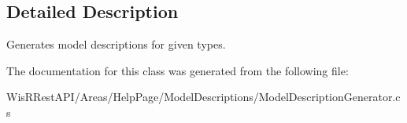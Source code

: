 \subsection{Detailed Description}
Generates model descriptions for given types. 



The documentation for this class was generated from the following file\+:\begin{DoxyCompactItemize}
\item 
Wis\+R\+Rest\+A\+P\+I/\+Areas/\+Help\+Page/\+Model\+Descriptions/Model\+Description\+Generator.\+cs\end{DoxyCompactItemize}
